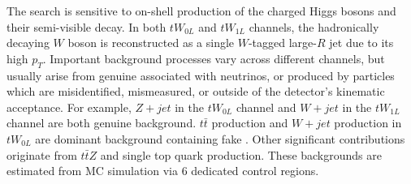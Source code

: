 The search is sensitive to on-shell production of the charged Higgs bosons and their semi-visible decay. In both $tW_{0L}$ and $tW_{1L}$ channels, the hadronically decaying $W$ boson is reconstructed as a single $W$-tagged large-$R$ jet due to its high $p_T$. Important background processes vary across different channels, but usually arise from genuine \met associated with neutrinos, or \met produced by particles which are misidentified, mismeasured, or outside of the detector's kinematic acceptance. For example, $Z+jet$ in the $tW_{0L}$ channel and $W+jet$ in the $tW_{1L}$ channel are both genuine \met background. $t\bar{t}$ production and $W+jet$ production in $tW_{0L}$ are dominant background containing fake \met. Other significant contributions originate from $t\bar{t}Z$ and single top quark production. These backgrounds are estimated from MC simulation via 6 dedicated control regions.

